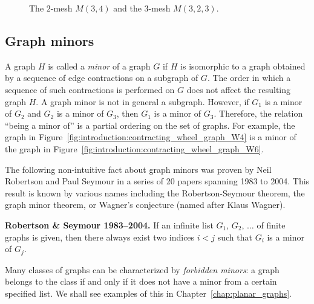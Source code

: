\begin{figure}[!htbp]
\centering
{}

\caption{The $2$-mesh $M(3, 4)$ and the $3$-mesh $M(3, 2, 3)$.}
\label{fig:introduction:mesh_grid_lattice}
\end{figure}



\subsection{Graph minors}

A graph $H$ is called a \emph{minor} of a graph $G$
if $H$ is isomorphic to a graph obtained by a sequence of edge
contractions on a subgraph of $G$.  The order in which a sequence of
such contractions is performed on $G$ does not affect the resulting
graph $H$. A graph minor is not in general a subgraph. However, if
$G_1$ is a minor of $G_2$ and $G_2$ is a minor of $G_3$, then $G_1$ is
a minor of $G_3$. Therefore, the relation ``being a minor of'' is a
partial ordering on the set of graphs. For example, the graph in
Figure~\ref{fig:introduction:contracting_wheel_graph_W4} is a minor of
the graph in Figure~\ref{fig:introduction:contracting_wheel_graph_W6}.

The following non-intuitive fact about graph minors was proven by
Neil Robertson and Paul
Seymour in a series of 20 papers spanning 1983
to 2004. This result is known by various names including the
Robertson-Seymour theorem, the graph minor theorem, or Wagner's
conjecture (named after Klaus
Wagner).

\begin{theorem}
\label{thm:introduction:graph_minor}
\textbf{Robertson \& Seymour 1983--2004.}
If an infinite list $G_1$, $G_2$, $\dots$ of finite graphs is given,
then there always exist two indices $i < j$ such that $G_i$ is a minor
of $G_j$.
\end{theorem}

Many classes of graphs can be characterized by
\emph{forbidden minors}: a graph belongs to the
class if and only if it does not have a minor from a certain specified
list. We shall see examples of this in Chapter~\ref{chap:planar_graphs}.



